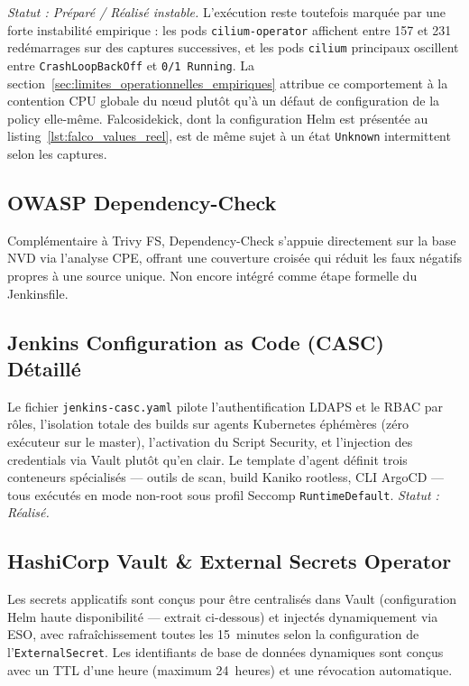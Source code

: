 \textit{Statut : Préparé / Réalisé instable.} L'exécution reste toutefois marquée par une forte instabilité empirique : les pods \texttt{cilium-operator} affichent entre 157 et 231 redémarrages sur des captures successives, et les pods \texttt{cilium} principaux oscillent entre \texttt{CrashLoopBackOff} et \texttt{0/1 Running}. La section~\ref{sec:limites_operationnelles_empiriques} attribue ce comportement à la contention CPU globale du nœud plutôt qu'à un défaut de configuration de la policy elle-même. Falcosidekick, dont la configuration Helm est présentée au listing~\ref{lst:falco_values_reel}, est de même sujet à un état \texttt{Unknown} intermittent selon les captures.

\subsection{OWASP Dependency-Check}
Complémentaire à Trivy FS, Dependency-Check s'appuie directement sur la base NVD via l'analyse CPE, offrant une couverture croisée qui réduit les faux négatifs propres à une source unique. Non encore intégré comme étape formelle du Jenkinsfile.

\subsection{Jenkins Configuration as Code (CASC) Détaillé}
Le fichier \texttt{jenkins-casc.yaml} pilote l'authentification LDAPS et le RBAC par rôles, l'isolation totale des builds sur agents Kubernetes éphémères (zéro exécuteur sur le master), l'activation du Script Security, et l'injection des credentials via Vault plutôt qu'en clair. Le template d'agent définit trois conteneurs spécialisés — outils de scan, build Kaniko rootless, CLI ArgoCD — tous exécutés en mode non-root sous profil Seccomp \texttt{RuntimeDefault}. \textit{Statut : Réalisé.}

\subsection{HashiCorp Vault \& External Secrets Operator}
\label{subsec:vault_eso_v2}
Les secrets applicatifs sont conçus pour être centralisés dans Vault (configuration Helm haute disponibilité — extrait ci-dessous) et injectés dynamiquement via ESO, avec rafraîchissement toutes les 15~minutes selon la configuration de l'\texttt{ExternalSecret}. Les identifiants de base de données dynamiques sont conçus avec un TTL d'une heure (maximum 24~heures) et une révocation automatique.

